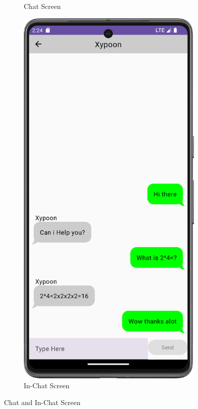 \begin{figure}[H]
\begin{subfigure}[b]{0.5\textwidth}
    \caption{Chat Screen}
    \label{fig:chat_screen}
  \end{subfigure}
  \hfill
  \begin{subfigure}[b]{0.5\textwidth}
    \includegraphics[width=\textwidth]{Figures/Product_Images/Chat/in_chat.png}
    \caption{In-Chat Screen}
    \label{fig:in_chat_screen}
  \end{subfigure}
  \caption{Chat and In-Chat Screen}
\end{figure}
